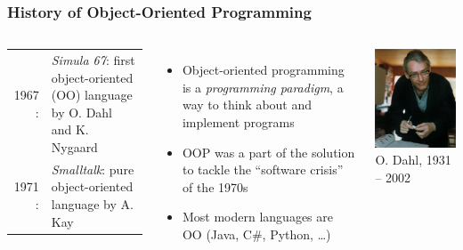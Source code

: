 \documentclass{slides}
\begin{document}
\begin{frame}
  \frametitle{History of Object-Oriented Programming}
  \begin{columns}[c,onlytextwidth]
    \begin{tabular}{r<{:}p{}}
      1967 & \textit{Simula 67}: first object-oriented (OO) language
      by O. Dahl and K. Nygaard\\
      1971 & \textit{Smalltalk}: pure object-oriented language by
      A. Kay\\
    \end{tabular}
    \begin{itemize}
    \item Object-oriented programming is a \emph{programming paradigm},
      \ie a way to think about and implement programs
    \item OOP was a part of the solution to tackle the ``software
      crisis'' of the 1970s
    \item Most modern languages are OO (\eg Java, C\#, Python, \dots)
    \end{itemize}

    \centering
    \includegraphics[height=0.25\textheight]{dahl}\\
    {\tiny O. Dahl, 1931 -- 2002}
    \vspace{\baselineskip}


\end{columns}
\end{frame}
\end{document}
